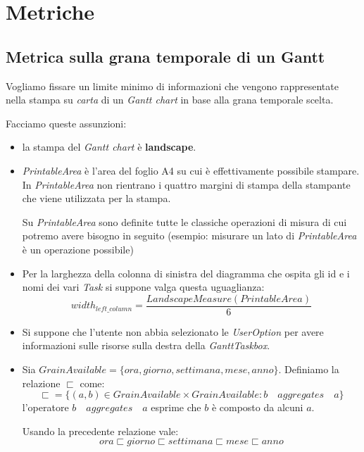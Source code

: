 \section{Metriche}

\subsection{Metrica sulla grana temporale di un Gantt}
Vogliamo fissare un limite minimo di informazioni che vengono rappresentate
nella stampa su \emph{carta} di un \emph{Gantt chart} in base alla grana
temporale scelta.

Facciamo queste assunzioni:
\begin{itemize}
  \item la stampa del \emph{Gantt chart} \`e \textbf{landscape}.
  \item \emph{PrintableArea} \`e l'area del foglio A4 su cui \`e effettivamente
  possibile stampare. In \emph{PrintableArea} non rientrano i quattro margini
  di stampa della stampante che viene utilizzata per la stampa.
  
  Su \emph{PrintableArea} sono definite tutte le classiche operazioni di misura
  di cui potremo avere bisogno in seguito (esempio: misurare un lato di
  \emph{PrintableArea} \`e un operazione possibile)
  
  \item Per la larghezza della colonna di sinistra del diagramma che ospita gli
  id e i nomi dei vari \emph{Task} si suppone valga questa uguaglianza:
  \begin{displaymath}
  	width_{left\_column} = \frac{LandscapeMeasure(PrintableArea)}{6}
  \end{displaymath}
  
   \item Si suppone che l'utente non abbia selezionato le \emph{UserOption} per
   avere informazioni sulle risorse sulla destra della \emph{GanttTaskbox}.

	\item Sia $GrainAvailable = \lbrace ora
	, giorno, settimana, mese, anno	\rbrace$. Definiamo la relazione $\sqsubset$
	come:
	\begin{displaymath}
	\sqsubset = \lbrace (a, b) \in GrainAvailable \times GrainAvailable : b \quad
	aggregates \quad a
	\rbrace
	\end{displaymath}
	l'operatore $b \quad aggregates \quad a$ esprime che $b$ \`e composto da alcuni
	$a$.
	
	Usando la precedente relazione vale:
	\begin{displaymath}
  	 ora \sqsubset giorno \sqsubset settimana \sqsubset mese \sqsubset anno
  	\end{displaymath}
\end{itemize}

